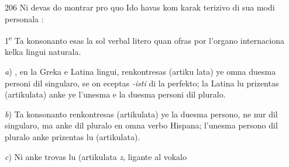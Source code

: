 \begin{VUpage}[210]{206}
Ni devas do montrar pro quo Ido havas  kom karak\cc
terizivo di sua modi personala :

\VUblanc{0.92mm}
1\textsuperscript{e} Ta konsonanto esas la sol verbal litero quan ofras por\nl
l'organo internaciona kelka lingui naturala.

\textit{a}) , en la Greka e Latina lingui, renkontresas (artiku\cc
lata) ye omna duesma personi dil singularo, se on eceptas\nl
\textit{-isti} di la perfekto; la Latina lu prizentas (artikulata) anke\nl
ye l'unesma e la duesma personi dil pluralo.

\textit{b}) Ta konsonanto renkontresas (artikulata) ye la duesma\nl
persono, ne nur dil singularo, ma anke dil pluralo en omna\nl
verbo Hispana; l'unesma persono dil pluralo anke prizentas\nl
lu (artikulata).

\textit{c}) Ni anke trovas lu (artikulata \textit{z}, ligante al vokalo\nl
\end{VUpage}


